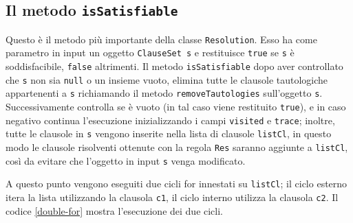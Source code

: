 \documentclass[a4paper,12pt]{report}
\begin{document}
\subsection{Il metodo \texttt{isSatisfiable}}
\label{isSat}
Questo è il metodo più importante della classe \texttt{Resolution}. Esso ha come parametro in input un oggetto \texttt{ClauseSet s} e restituisce \texttt{true} se \texttt{s} è soddisfacibile, \texttt{false} altrimenti. Il metodo \texttt{isSatisfiable} dopo aver controllato che \texttt{s} non sia \texttt{null} o un insieme vuoto, elimina tutte le clausole tautologiche appartenenti a \texttt{s} richiamando il metodo \texttt{removeTautologies} sull'oggetto \texttt{s}. Successivamente controlla se è vuoto (in tal caso viene restituito \texttt{true}), e in caso negativo continua l'esecuzione inizializzando i campi \texttt{visited} e \texttt{trace}; inoltre, tutte le clausole in \texttt{s} vengono inserite nella lista di clausole \texttt{listCl}, in questo modo le clausole risolventi ottenute con la regola \texttt{Res} saranno aggiunte a \texttt{listCl}, così da evitare che l'oggetto in input \texttt{s} venga modificato.

A questo punto vengono eseguiti due cicli for innestati su \texttt{listCl}; il ciclo esterno itera la lista utilizzando la clausola \texttt{c1}, il ciclo interno utilizza la clausola \texttt{c2}. Il codice \ref{double-for} mostra l'esecuzione dei due cicli. 
    
\end{document}
